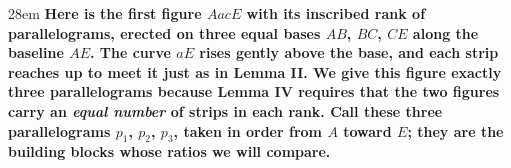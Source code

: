 \documentclass[border=4pt]{standalone}
\begin{document}
\begin{varwidth}{28em}
\large\bfseries
Here is the first figure $AacE$ with its inscribed rank of parallelograms, erected on three equal bases $AB$, $BC$, $CE$ along the baseline $AE$. The curve $aE$ rises gently above the base, and each strip reaches up to meet it just as in Lemma II. We give this figure exactly three parallelograms because Lemma IV requires that the two figures carry an \emph{equal number} of strips in each rank. Call these three parallelograms $p_1$, $p_2$, $p_3$, taken in order from $A$ toward $E$; they are the building blocks whose ratios we will compare.
\end{varwidth}
\end{document}
